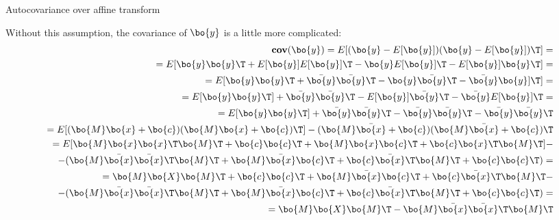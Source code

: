 \documentclass{beamer}
\begin{document}
\begin{frame}{Autocovariance over affine transform}
	\begin{flushleft}
		
		Without this assumption, the covariance of $\bo{y}$ is a little more complicated:
		\begin{align*}
			\textbf{cov}(\bo{y}) = E[(\bo{y} - E[\bo{y}])(\bo{y} - E[\bo{y}])\T] =
			\\
			= E[\bo{y}\bo{y}\T
			+ E[\bo{y}]E[\bo{y}]\T
			- \bo{y}E[\bo{y}]\T
			- E[\bo{y}]\bo{y}\T] =
			\\
			=
			E[\bo{y}\bo{y}\T
			+ \bar{\bo{y}}\bar{\bo{y}}\T
			- \bo{y}\bar{\bo{y}}\T
			- \bar{\bo{y}}\bo{y}]\T]=
			\\
			=
			E[\bo{y}\bo{y}\T]
			+ \bar{\bo{y}}\bar{\bo{y}}\T
			- E[\bo{y}]\bar{\bo{y}}\T
			- \bar{\bo{y}}E[\bo{y}]\T=
			\\
			=
			E[\bo{y}\bo{y}\T]
			+ \bar{\bo{y}}\bar{\bo{y}}\T
			- \bar{\bo{y}}\bar{\bo{y}}\T
			- \bar{\bo{y}}\bar{\bo{y}}\T
			\\
			=
			E[(\bo{M}\bo{x} + \bo{c})(\bo{M}\bo{x} + \bo{c})\T]
			- (\bo{M}\bar{\bo{x}} + \bo{c})(\bo{M}\bar{\bo{x}} + \bo{c})\T
			\\
			=
			E[\bo{M}\bo{x}\bo{x}\T \bo{M}\T+
			\bo{c}\bo{c}\T+
			\bo{M}\bo{x}\bo{c}\T+
			\bo{c}\bo{x}\T \bo{M}\T]
			-\\
			- (\bo{M}\bar{\bo{x}}\bar{\bo{x}}\T\bo{M}\T +
			\bo{M}\bar{\bo{x}}\bo{c}\T+
			\bo{c}\bar{\bo{x}}\T\bo{M}\T+
			\bo{c}\bo{c}\T)=
			\\
			=
			\bo{M}\bo{X} \bo{M}\T+
			\bo{c}\bo{c}\T+
			\bo{M}\bar{\bo{x}}\bo{c}\T+
			\bo{c}\bar{\bo{x}}\T \bo{M}\T
			-\\
			- (\bo{M}\bar{\bo{x}}\bar{\bo{x}}\T\bo{M}\T +
			\bo{M}\bar{\bo{x}}\bo{c}\T+
			\bo{c}\bar{\bo{x}}\T\bo{M}\T+
			\bo{c}\bo{c}\T)=
			\\
			=
			\bo{M}\bo{X} \bo{M}\T
			- \bo{M}\bar{\bo{x}}\bar{\bo{x}}\T\bo{M}\T
		\end{align*}
		
	\end{flushleft}
\end{frame}


\begin{frame}
	\begin{flushleft}
		
		
	\end{flushleft}
\end{frame}
\end{document}
